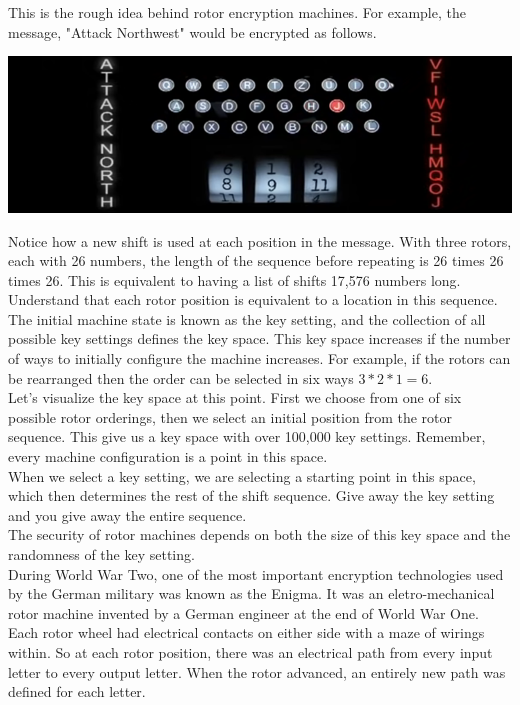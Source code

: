 \documentclass{report}
\begin{document}
This is the rough idea behind rotor encryption machines. For example, the message, "Attack Northwest" would be encrypted as follows.
  \begin{center}
 	\includegraphics[scale=1]{7.png}
 \end{center}
 Notice how a new shift is used at each position in the message. With three rotors, each with 26 numbers, the length of the sequence before repeating is 26 times 26 times 26. This is equivalent to having a list of shifts 17,576 numbers long. Understand that each rotor position is equivalent to a location in this sequence. The initial machine state is known as the key setting, and the collection of all possible key settings defines the key space. This key space increases if the number of ways to initially configure the machine increases. For example, if the rotors can be rearranged then the order can be selected in six ways $3*2*1=6$.\\
Let's visualize the key space at this point. First we choose from one of six possible rotor orderings, then we select an initial position from the rotor sequence. This give us a key space with over 100,000 key settings. Remember, every machine configuration is a point in this space.\\ When we select a key setting, we are selecting a starting point in this space, which then determines the rest of the shift sequence. Give away the key setting and you give away the entire sequence.\\
The security of rotor machines depends on both the size of this key space and the randomness of the key setting. \\
During World War Two, one of the most important encryption technologies used by the German military was known as the Enigma. It was an eletro-mechanical rotor machine invented by a German engineer at the end of World War One. Each rotor wheel had electrical contacts on either side with a maze of wirings within. So at each rotor position, there was an electrical path from every input letter to every output letter. When the rotor advanced, an entirely new path was defined for each letter.
\end{document}
